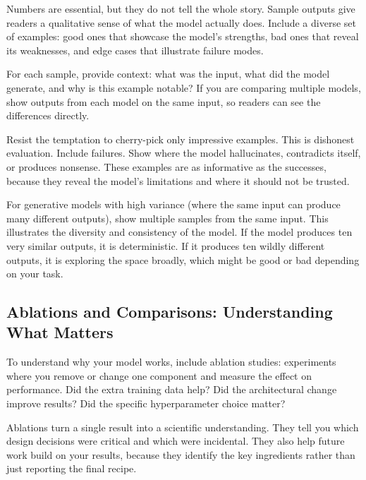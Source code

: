 Numbers are essential, but they do not tell the whole story. Sample outputs give readers a qualitative sense of what the model actually does. Include a diverse set of examples: good ones that showcase the model's strengths, bad ones that reveal its weaknesses, and edge cases that illustrate failure modes.

\vspace{0.3cm}

For each sample, provide context: what was the input, what did the model generate, and why is this example notable? If you are comparing multiple models, show outputs from each model on the same input, so readers can see the differences directly.

\vspace{0.3cm}

Resist the temptation to cherry-pick only impressive examples. This is dishonest evaluation. Include failures. Show where the model hallucinates, contradicts itself, or produces nonsense. These examples are as informative as the successes, because they reveal the model's limitations and where it should not be trusted.

\vspace{0.3cm}

For generative models with high variance (where the same input can produce many different outputs), show multiple samples from the same input. This illustrates the diversity and consistency of the model. If the model produces ten very similar outputs, it is deterministic. If it produces ten wildly different outputs, it is exploring the space broadly, which might be good or bad depending on your task.

\vspace{1em}

\subsection{Ablations and Comparisons: Understanding What Matters}

To understand why your model works, include ablation studies: experiments where you remove or change one component and measure the effect on performance. Did the extra training data help? Did the architectural change improve results? Did the specific hyperparameter choice matter?

\vspace{0.3cm}

Ablations turn a single result into a scientific understanding. They tell you which design decisions were critical and which were incidental. They also help future work build on your results, because they identify the key ingredients rather than just reporting the final recipe.

